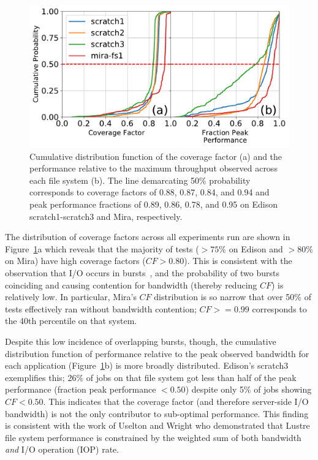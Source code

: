 \begin{figure}[t]
    \centering
    \includegraphics[width=\columnwidth]{figs/cdf-both.pdf}
    \caption{Cumulative distribution function of the coverage factor (a) and the    performance relative to the maximum throughput observed across each file system (b).
    The line demarcating 50\% probability corresponds to coverage factors of 0.88, 0.87, 0.84, and 0.94 and peak performance fractions of 0.89, 0.86, 0.78, and 0.95 on Edison scratch1-scratch3 and Mira, respectively.}
    \label{fig:cdfs}
\vspace{-.2in}
\end{figure}

The distribution of coverage factors across all experiments run are shown in Figure~\ref{fig:cdfs}a which reveals that the majority of tests ($> 75\%$ on Edison and $> 80\%$ on Mira) have high coverage factors ($\mathit{CF} > 0.80$).
This is consistent with the observation that I/O occurs in bursts~\cite{Carns2011,Liu2016}, and the probability of two bursts coinciding and causing contention for bandwidth (thereby reducing $\mathit{CF}$) is relatively low.
In particular, Mira's $\mathit{CF}$ distribution is so narrow that over 50\% of tests effectively ran without bandwidth contention; $\mathit{CF} >= 0.99$ corresponds to the 40th percentile on that system.

Despite this low incidence of overlapping bursts, though, the cumulative
distribution function of performance relative to the peak observed
bandwidth for each application (Figure~\ref{fig:cdfs}b) is more broadly distributed.
Edison's scratch3 exemplifies this; 26\% of jobs on that file system got less than half of the peak performance (fraction peak performance $< 0.50$) despite only 5\% of jobs showing $\mathit{CF} < 0.50$.  This indicates that the coverage factor (and therefore server-side I/O bandwidth) is not the only contributor to sub-optimal performance.  
This finding is consistent with the work of Uselton and Wright\cite{Uselton2013} who demonstrated that Lustre file system performance is constrained by the weighted sum of both bandwidth \emph{and} I/O operation (IOP) rate.  

